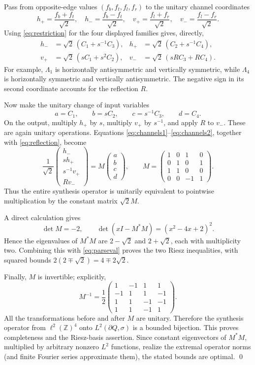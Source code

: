 \documentclass[11pt]{article}
\newcommand{\Z}{\mathbb Z}
\begin{document}
Pass from opposite-edge values $(f_b,f_t,f_l,f_r)$ to the unitary channel
coordinates
\[
h_+=\frac{f_b+f_t}{\sqrt2},\quad
h_-=\frac{f_b-f_t}{\sqrt2},\quad
v_+=\frac{f_l+f_r}{\sqrt2},\quad
v_-=\frac{f_l-f_r}{\sqrt2}.
\]
Using \eqref{eq:restriction} for the four displayed families gives, directly,
\begin{align}
 h_-&=\sqrt2\,(C_1+s^{-1}C_3),
 &h_+&=\sqrt2\,(C_2+s^{-1}C_4),\label{eq:channels1}\\
 v_+&=\sqrt2\,(sC_1+s^2C_2),
 &v_-&=\sqrt2\,(sRC_3+RC_4).\label{eq:channels2}
\end{align}
For example, $\Lambda_1$ is horizontally antisymmetric and vertically
symmetric, while $\Lambda_4$ is horizontally symmetric and vertically
antisymmetric.  The negative sign in its second coordinate accounts for the
reflection $R$.

Now make the unitary change of input variables
\[
                 a=C_1,\qquad b=sC_2,\qquad
                 c=s^{-1}C_3,\qquad d=C_4.
\]
On the output, multiply $h_+$ by $s$, multiply $v_+$ by $s^{-1}$, and apply
$R$ to $v_-$.  These are again unitary operations.  Equations
\eqref{eq:channels1}--\eqref{eq:channels2}, together with
\eqref{eq:reflection}, become
\[
 \frac1{\sqrt2}
 \begin{pmatrix}h_-\\ sh_+\\ s^{-1}v_+\\ Rv_-\end{pmatrix}
 =M\begin{pmatrix}a\\b\\c\\d\end{pmatrix},
 \qquad
 M=\begin{pmatrix}
 1&0&1&0\\
 0&1&0&1\\
 1&1&0&0\\
 0&0&-1&1
 \end{pmatrix}.
\]
Thus the entire synthesis operator is unitarily equivalent to pointwise
multiplication by the constant matrix $\sqrt2M$.

A direct calculation gives
\[
 \det M=-2,
 \qquad
 \det(xI-M^*M)=(x^2-4x+2)^2.
\]
Hence the eigenvalues of $M^*M$ are $2-\sqrt2$ and $2+\sqrt2$, each with
multiplicity two.  Combining this with \eqref{eq:parseval} proves the two
Riesz inequalities, with squared bounds $2(2\mp\sqrt2)=4\mp2\sqrt2$.

Finally, $M$ is invertible; explicitly,
\[
 M^{-1}=\frac12\begin{pmatrix}
 1&-1&1&1\\ -1&1&1&-1\\ 1&1&-1&-1\\ 1&1&-1&1
 \end{pmatrix}.
\]
All the transformations before and after $M$ are unitary.  Therefore the
synthesis operator from $\ell^2(\Z)^4$ onto $L^2(\partial Q,\sigma)$ is a
bounded bijection.  This proves completeness and the Riesz-basis assertion.
Since constant eigenvectors of $M^*M$, multiplied by arbitrary nonzero
$L^2$ functions, realize the extremal operator norms (and finite Fourier
series approximate them), the stated bounds are optimal. \qed
\end{document}
